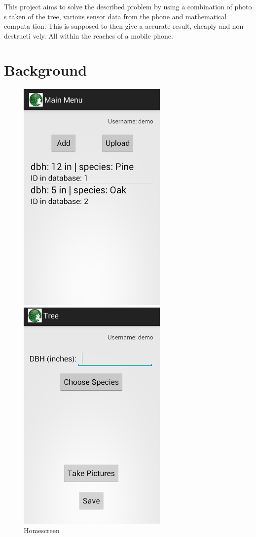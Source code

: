 This project aims to solve the described problem by using a combination of photo
s taken of the tree, various sensor data from the phone and mathematical computa
tion. This is supposed to then give a accurate result, cheaply and non-destructi
vely. All within the reaches of a mobile phone.

\section{Background}

\begin{figure}[!htb]
		\centering
  		\includegraphics[width=0.65\textwidth]{main.png}
	  	\caption{Homescreen}
  		\label{main}
	\endminipage\hfill
		\centering
	  	\includegraphics[width=0.65\textwidth]{input.png}

\end{figure}
